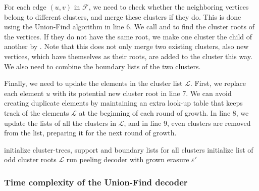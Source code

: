 For each edge $(u,v)$ in $\mathcal{F}$, we need to check whether the neighboring vertices belong to different clusters, and merge these clusters if they do. This is done using the Union-Find algorithm in line 6. We call  and  to find the cluster roots of the vertices. If they do not have the same root, we make one cluster the child of another by . Note that this does not only merge two existing clusters, also new vertices, which have themselves as their roots, are added to the cluster this way. We also need to combine the boundary lists of the two clusters.

Finally, we need to update the elements in the cluster list $\mathcal{L}$. First, we replace each element $u$ with its potential new cluster root  in line 7. We can avoid creating duplicate elements by maintaining an extra look-up table that keeps track of the elements $\mathcal{L}$ at the beginning of each round of growth. In line 8, we update the  lists of all the clusters in $\mathcal{L}$, and in line 9, even clusters are removed from the list, preparing it for the next round of growth.

\begin{algo}[algotitle=Union-Find decoder \cite{nickerson2017}, label=algo:uf]
\begin{algorithm}[H]
    \SetAlgoNoEnd
    \BlankLine
    initialize cluster-trees, support and boundary lists for all clusters \;
    initialize list of odd cluster roots $\mathcal{L}$\;
    run peeling decoder with grown erasure $\varepsilon'$
\end{algorithm}
\end{algo}

\subsubsection{Time complexity of the Union-Find decoder}

